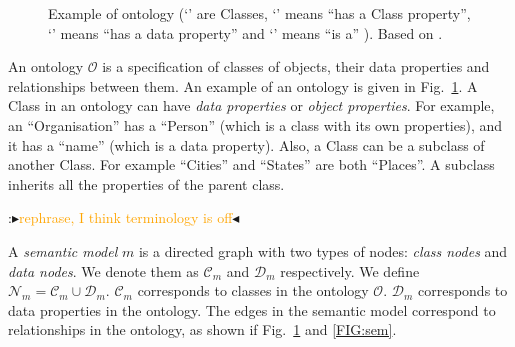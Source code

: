 \documentclass[letterpaper]{article} %
\newcommand{\authornote}[3]{
  {\fbox{\sc 
  #1}:$\blacktriangleright$\textcolor{#2}{\small{#3}}$\blacktriangleleft$}%
}
\newcommand{\npr}[1]{\authornote{NPR}{orange}{#1}}
\begin{document}
\begin{figure}[ht]
\caption{Example of ontology
(`' are Classes, `' means ``has a Class property'', 
`' 
means ``has 
a data 
property'' and 
`' means ``is a'' ). Based on 
\cite{Taheriyan2013}.
}
\label{FIG:onto}
\end{figure}




An ontology $\mathcal{O}$ is a specification of classes of objects, their 
data properties and relationships between them.
An example of an ontology is given in Fig.~\ref{FIG:onto}. 
A Class in an ontology can have \emph{data properties} or \emph{object properties}. 
For example, an ``Organisation'' has a ``Person'' 
(which is a class with its own properties), and it has a ``name'' (which 
is a data property). 
Also, a Class can be a subclass of another Class. 
For 
example ``Cities'' and ``States'' are both ``Places''. 
A subclass inherits all the properties of the parent class.
\npr{rephrase, I think terminology is off}

A \emph{semantic model} $m$ is a directed graph with two types of nodes: 
\emph{class nodes} and \emph{data nodes}. 
We denote them as $\mathcal{C}_m$ and $\mathcal{D}_m$ respectively.
 We define $\mathcal{N}_m = \mathcal{C}_m \cup 
\mathcal{D}_m$. $ \mathcal{C}_m$ corresponds to classes in the ontology 
$\mathcal{O}$. $\mathcal{D}_m$ corresponds to data 
properties in the ontology. 
The edges in the semantic model correspond to relationships in the ontology, as shown if Fig.~\ref{FIG:onto} and \ref{FIG:sem}.
\end{document}
